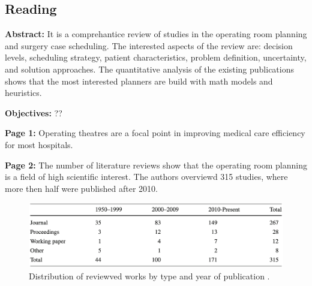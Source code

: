 \subsection{Reading}
    \textbf{Abstract:}
    It is a comprehantice review of studies in the operating room planning and surgery case scheduling. The interested aspects of the review are: decision levels, scheduling strategy, patient characteristics, problem definition, uncertainty, and solution approaches. The quantitative analysis of the existing publications shows that the most interested planners are build with math models and heuristics.
    
    \textbf{Objectives:}
    ??
    
    \textbf{Page 1:}
    Operating theatres are a focal point in improving medical care efficiency for most hospitals.
    
    \textbf{Page 2:}
    The number of literature reviews show that the operating room planning is a field of high scientific interest. The authors overviewd 315 studies, where more then half were published after 2010.
    \begin{figure}[H]
        \centering
        \includegraphics[width=1\textwidth]{figures/0013_SR01CN19/fig1.png}
        \caption{Distribution of reviewved works by type and year of publication \cite{x203}.}
        \label{fig1:0013_SR01CN19}
    \end{figure}
    
